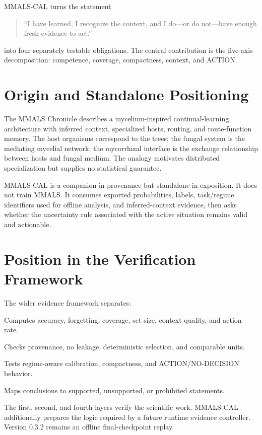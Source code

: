 \documentclass[10pt]{article}
\newcommand{\mmalscal}{\textsc{MMALS-CAL}}
\begin{document}
\mmalscal{} turns the statement
\begin{quote}
``I have learned, I recognize the context, and I do---or do not---have enough fresh evidence to act.''
\end{quote}
into four separately testable obligations. The central contribution is the five-axis decomposition: competence, coverage, compactness, context, and ACTION.

\section{Origin and Standalone Positioning}
The MMALS Chronicle describes a mycelium-inspired continual-learning architecture with inferred context, specialized hosts, routing, and route-function memory. The host organisms correspond to the trees; the fungal system is the mediating mycelial network; the mycorrhizal interface is the exchange relationship between hosts and fungal medium. The analogy motivates distributed specialization but supplies no statistical guarantee.

\mmalscal{} is a companion in provenance but standalone in exposition. It does not train MMALS. It consumes exported probabilities, labels, task/regime identifiers used for offline analysis, and inferred-context evidence, then asks whether the uncertainty rule associated with the active situation remains valid and actionable.

\section{Position in the Verification Framework}
The wider evidence framework separates:
\begin{description}[leftmargin=1.45in,style=nextline]
\item[Metric Evaluator] Computes accuracy, forgetting, coverage, set size, context quality, and action rate.
\item[Protocol Verifier] Checks provenance, no leakage, deterministic selection, and comparable units.
\item[MMALS-CAL] Tests regime-aware calibration, compactness, and ACTION/NO-DECISION behavior.
\item[Claim Verifier] Maps conclusions to supported, unsupported, or prohibited statements.
\end{description}
The first, second, and fourth layers verify the scientific work. \mmalscal{} additionally prepares the logic required by a future runtime evidence controller. Version 0.3.2 remains an offline final-checkpoint replay.
\end{document}
